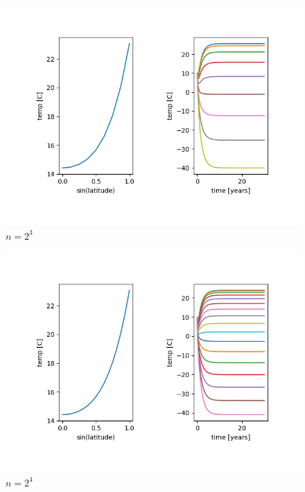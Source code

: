 \documentclass{article}
\theoremstyle{remark}
\begin{document}
\begin{figure}
\centering
\includegraphics{n2e3.png}
\caption{$n = 2^3$}
\end{figure}

\begin{figure}
\centering
\includegraphics{n2e4.png}
\caption{$n = 2^4$}
\end{figure}
\end{document}

